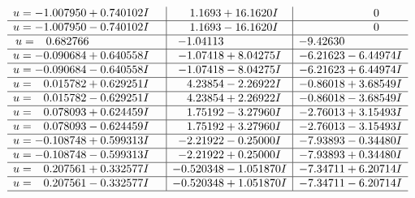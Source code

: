\documentclass[1p]{elsarticle_modified}
\theoremstyle{definition}
\begin{document}
$$\begin{array}{c|c|c}
\begin{aligned}
u &= -1.007950 + 0.740102 I\end{aligned}
 & \phantom{-}1.1693 + 16.1620 I & \phantom{-0.000000 } 0 \\ \hline\begin{aligned}
u &= -1.007950 - 0.740102 I\end{aligned}
 & \phantom{-}1.1693 - 16.1620 I & \phantom{-0.000000 } 0 \\ \hline\begin{aligned}
u &= \phantom{-}0.682766\phantom{ +0.000000I}\end{aligned}
 & -1.04113\phantom{ +0.000000I} & -9.42630\phantom{ +0.000000I} \\ \hline\begin{aligned}
u &= -0.090684 + 0.640558 I\end{aligned}
 & -1.07418 + 8.04275 I & -6.21623 - 6.44974 I \\ \hline\begin{aligned}
u &= -0.090684 - 0.640558 I\end{aligned}
 & -1.07418 - 8.04275 I & -6.21623 + 6.44974 I \\ \hline\begin{aligned}
u &= \phantom{-}0.015782 + 0.629251 I\end{aligned}
 & \phantom{-}4.23854 - 2.26922 I & -0.86018 + 3.68549 I \\ \hline\begin{aligned}
u &= \phantom{-}0.015782 - 0.629251 I\end{aligned}
 & \phantom{-}4.23854 + 2.26922 I & -0.86018 - 3.68549 I \\ \hline\begin{aligned}
u &= \phantom{-}0.078093 + 0.624459 I\end{aligned}
 & \phantom{-}1.75192 - 3.27960 I & -2.76013 + 3.15493 I \\ \hline\begin{aligned}
u &= \phantom{-}0.078093 - 0.624459 I\end{aligned}
 & \phantom{-}1.75192 + 3.27960 I & -2.76013 - 3.15493 I \\ \hline\begin{aligned}
u &= -0.108748 + 0.599313 I\end{aligned}
 & -2.21922 - 0.25000 I & -7.93893 - 0.34480 I \\ \hline\begin{aligned}
u &= -0.108748 - 0.599313 I\end{aligned}
 & -2.21922 + 0.25000 I & -7.93893 + 0.34480 I \\ \hline\begin{aligned}
u &= \phantom{-}0.207561 + 0.332577 I\end{aligned}
 & -0.520348 - 1.051870 I & -7.34711 + 6.20714 I \\ \hline\begin{aligned}
u &= \phantom{-}0.207561 - 0.332577 I\end{aligned}
 & -0.520348 + 1.051870 I & -7.34711 - 6.20714 I\\
 \hline 
 \end{array}$$\newpage
\end{document}
